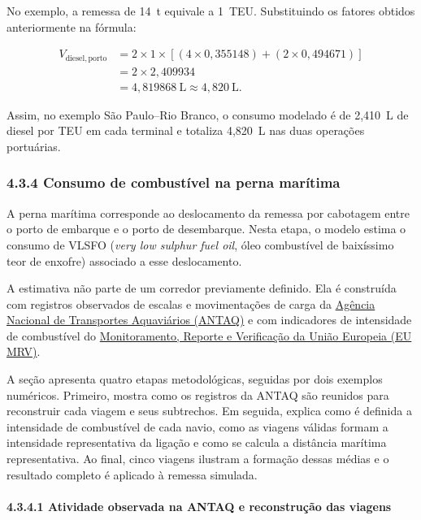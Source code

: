 \documentclass[brazil,]{article}
\let\oldsubsubsection\subsubsection
\renewcommand{\subsubsection}{\Needspace{10\baselineskip}\oldsubsubsection}
\let\oldparagraph\paragraph
\renewcommand{\paragraph}[1]{\Needspace{7\baselineskip}\oldparagraph{#1}\mbox{}}
\begin{document}
No exemplo, a remessa de 14~t equivale a 1~TEU. Substituindo os fatores
obtidos anteriormente na fórmula:

\[
\begin{aligned}
V_{\mathrm{diesel,porto}}
&=2\times1\times
\left[(4\times0{,}355148)+(2\times0{,}494671)\right]\\
&=2\times2{,}409934\\
&=4{,}819868\ \mathrm{L}\approx4{,}820\ \mathrm{L}.
\end{aligned}
\]

Assim, no exemplo São Paulo--Rio Branco, o consumo modelado é de
2,410~L de diesel por TEU em cada terminal e totaliza 4,820~L nas duas
operações portuárias.

\hypertarget{consumo-de-combustuxedvel-na-perna-maruxedtima}{%
\subsubsection{4.3.4 Consumo de combustível na perna
marítima}\label{consumo-de-combustuxedvel-na-perna-maruxedtima}}

A perna marítima corresponde ao deslocamento da remessa por cabotagem
entre o porto de embarque e o porto de desembarque. Nesta etapa, o modelo
estima o consumo de VLSFO (\emph{very low sulphur fuel oil}, óleo
combustível de baixíssimo teor de enxofre) associado a esse deslocamento.

A estimativa não parte de um corredor previamente definido. Ela é
construída com registros observados de escalas e movimentações de carga
da
\href{https://estatistica.antaq.gov.br/ea/sense/download.html}{Agência
Nacional de Transportes Aquaviários (ANTAQ)} e com indicadores de
intensidade de combustível do
\href{https://mrv.emsa.europa.eu/}{Monitoramento, Reporte e Verificação
da União Europeia (EU MRV)}.

A seção apresenta quatro etapas metodológicas, seguidas por dois
exemplos numéricos. Primeiro, mostra como os registros da ANTAQ são
reunidos para reconstruir cada viagem e seus subtrechos. Em seguida,
explica como é definida a intensidade de combustível de cada navio, como
as viagens válidas formam a intensidade representativa da ligação e como
se calcula a distância marítima representativa. Ao final, cinco viagens
ilustram a formação dessas médias e o resultado completo é aplicado à
remessa simulada.

\hypertarget{atividade-observada-na-antaq-e-reconstruuxe7uxe3o-das-viagens}{%
\paragraph{4.3.4.1 Atividade observada na ANTAQ e reconstrução das
viagens}\label{atividade-observada-na-antaq-e-reconstruuxe7uxe3o-das-viagens}}
\end{document}
